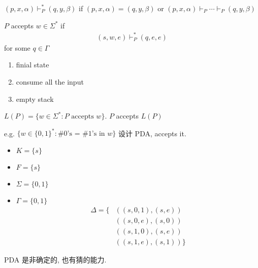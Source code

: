 \begin{definition}
    $(p,x,\alpha)\vdash_P^* (q,y,\beta)$ if $(p,x,\alpha)=(q,y,\beta)$ or $(p,x,\alpha)\vdash_P\cdots\vdash_P(q,y,\beta)$
\end{definition}

\begin{definition}
    $P$ accepts $w\in\Sigma^*$ if
    \begin{align*}
        (s,w,e)\vdash_P^*(q,e,e)
    \end{align*}
    for some $q\in\Gamma$
    \begin{enumerate}
        \item finial state
        \item consume all the input
        \item empty stack
    \end{enumerate}
\end{definition}

\begin{definition}
    $L(P)=\{ w\in\Sigma^*: P\text{ accepts }w \}$. $P$ accepts $L(P)$
\end{definition}

e.g. $\{ w\in \{ 0,1 \}^*: \text{\# 0's = \# 1's in } w\}$ 设计 PDA, accepts it. 
\begin{itemize}
    \item $K=\{ s\}$
    \item $F=\{ s\}$
    \item $\Sigma=\{ 0,1 \}$
    \item $\Gamma=\{ 0,1 \}$
    \begin{align*}
        \Delta=\{&((s,0,1), (s,e))\\
        &((s,0,e),(s,0))\\
        &((s,1,0), (s,e))\\
        &((s,1,e),(s,1))
         \}
    \end{align*}
\end{itemize}
PDA 是非确定的, 也有猜的能力. 